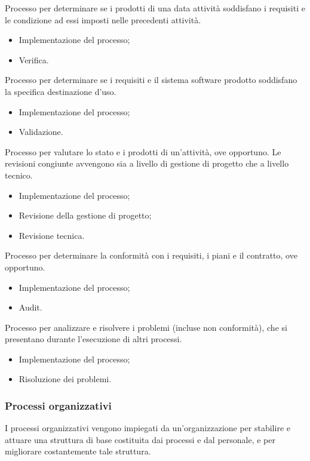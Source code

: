Processo per determinare se i prodotti di una data attività soddisfano
i requisiti e le condizione ad essi imposti nelle precedenti attività.
\begin{itemize}
    \item Implementazione del processo;
    \item Verifica.
\end{itemize}

Processo per determinare se i requisiti e il sistema software
prodotto soddisfano la specifica destinazione d'uso.
\begin{itemize}
    \item Implementazione del processo;
    \item Validazione.
\end{itemize}

Processo per valutare lo stato e i prodotti di un'attività, ove opportuno.
Le revisioni congiunte avvengono sia a livello di gestione di progetto che
a livello tecnico.
\begin{itemize}
    \item Implementazione del processo;
    \item Revisione della gestione di progetto;
    \item Revisione tecnica.
\end{itemize}

Processo per determinare la conformità con i requisiti, i piani 
e il contratto, ove opportuno.
\begin{itemize}
    \item Implementazione del processo;
    \item Audit.
\end{itemize}

Processo per analizzare e risolvere i problemi (incluse non conformità),
che si presentano durante l'esecuzione di altri processi. 
\begin{itemize}
    \item Implementazione del processo;
    \item Risoluzione dei problemi.
\end{itemize}

\subsubsection{Processi organizzativi}
I processi organizzativi vengono impiegati da un'organizzazione per stabilire 
e attuare una struttura di base costituita dai processi e dal personale,
e per migliorare costantemente tale struttura.

